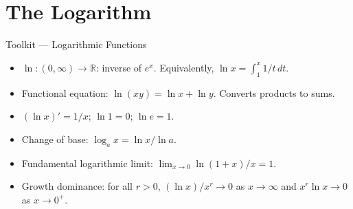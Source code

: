 \section{The Logarithm}

\begin{toolkitbox}{Toolkit --- Logarithmic Functions}
\begin{itemize}
  \item $\ln : (0,\infty) \to \mathbb{R}$: inverse of $e^x$.
    Equivalently, $\ln x = \int_1^x 1/t\, dt$.
  \item Functional equation: $\ln(xy) = \ln x + \ln y$.
    Converts products to sums.
  \item $(\ln x)' = 1/x$;\; $\ln 1 = 0$;\; $\ln e = 1$.
  \item Change of base: $\log_a x = \ln x / \ln a$.
  \item Fundamental logarithmic limit:
    $\lim_{x \to 0}\ln(1+x)/x = 1$.
  \item Growth dominance: for all $r > 0$,
    $(\ln x)/x^r \to 0$ as $x \to \infty$ and
    $x^r \ln x \to 0$ as $x \to 0^+$.
\end{itemize}
\end{toolkitbox}


